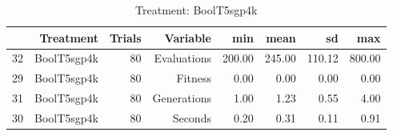 \begin{table}[ht]
\centering
\begin{tabular}{rrrrrrrr}
  \hline
 & Treatment & Trials & Variable & min & mean & sd & max \\ 
  \hline
32 & BoolT5sgp4k &  80 & Evaluations & 200.00 & 245.00 & 110.12 & 800.00 \\ 
  29 & BoolT5sgp4k &  80 & Fitness & 0.00 & 0.00 & 0.00 & 0.00 \\ 
  31 & BoolT5sgp4k &  80 & Generations & 1.00 & 1.23 & 0.55 & 4.00 \\ 
  30 & BoolT5sgp4k &  80 & Seconds & 0.20 & 0.31 & 0.11 & 0.91 \\ 
   \hline
\end{tabular}
\caption{Treatment: BoolT5sgp4k} 
\end{table}
